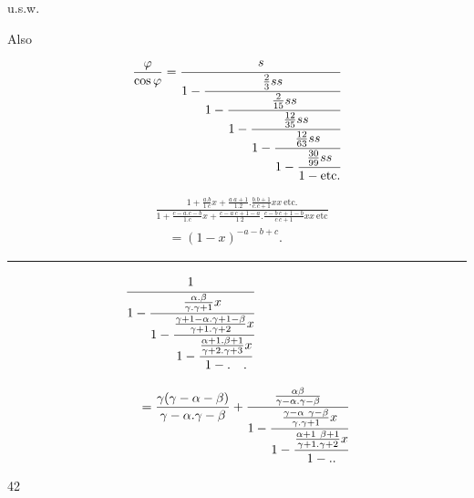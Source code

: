 \begin{center}u.s.w.\end{center}
\noindent Also
\[\frac\varphi{\cos\varphi}=\cfrac{s}{1-\cfrac{\frac23ss}{1-\cfrac{\frac2{15}ss}{1-\cfrac{\frac{12}{35}ss}{1-\cfrac{\frac{12}{63}ss}{1-\cfrac{\frac{30}{99}ss}{1-\text{etc.}}}}}}}\]
\clearpage{}
\noindent{\small[S. 60]}\par
\begin{center}\end{center}
{\small
\[\begin{aligned}
&\frac{1+\frac{a{.}b}{1\ c}x+\frac{a\ a+1}{1{.}2}{.}\frac{b{.}b+1}{c{.}c+1}xx\ \text{etc.}}{1+\frac{c-a{.}c-b}{1{.}c}x+\frac{c-a\ c+1-a}{1\ 2}{.}\frac{c-b\ c+1-b}{c\ c+1}xx\ \text{etc}}\\[.6em]
&\quad=(1-x)^{-a-b+c}.
\end{aligned}\]
}
\par\medskip\begin{center}\rule{.2\linewidth}{.4pt}\end{center}
\noindent{\small[S. 122]}\par
\begin{center}\end{center}
\[\begin{aligned}
&\cfrac1{1-\cfrac{\frac{\alpha{.}\beta}{\gamma{.}\gamma+1}x}{1-\cfrac{\frac{\gamma+1-\alpha{.}\gamma+1-\beta}{\gamma+1{.}\gamma+2}x}{1-\cfrac{\frac{\alpha+1{.}\beta+1}{\gamma+2{.}\gamma+3}x}{1-{.}\quad{.}}}}}\\[1em]
&\quad=\frac{\gamma(\gamma-\alpha-\beta)}{\gamma-\alpha{.}\gamma-\beta}
+\cfrac{\frac{\alpha\beta}{\gamma-\alpha{.}\gamma-\beta}}{1-\cfrac{\frac{\gamma-\alpha\ \gamma-\beta}{\gamma{.}\gamma+1}x}{1-\cfrac{\frac{\alpha+1\ \beta+1}{\gamma+1{.}\gamma+2}x}{1-{.}{.}}}}
\end{aligned}\]
\par\medskip{}\hfill42\par
\clearpage
\endgroup
